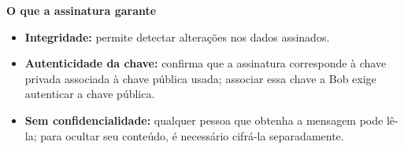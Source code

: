 \textbf{O que a assinatura garante}

\begin{itemize}
	\item \textbf{Integridade:} permite detectar alterações nos dados assinados.
	\item \textbf{Autenticidade da chave:} confirma que a assinatura corresponde à chave privada associada à chave pública usada; associar essa chave a Bob exige autenticar a chave pública.
	\item \textbf{Sem confidencialidade:} qualquer pessoa que obtenha a mensagem pode lê-la; para ocultar seu conteúdo, é necessário cifrá-la separadamente.
\end{itemize}

\pagebreak
